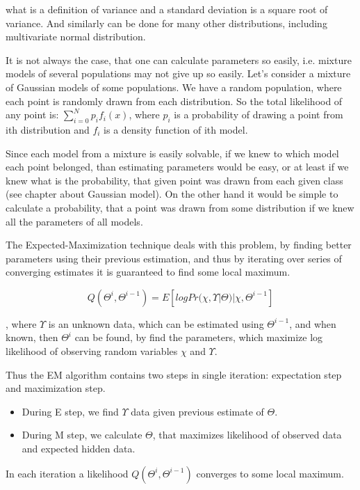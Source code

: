 \documentclass[12pt,a4paper,english]{article}
\begin{document}
what is a definition of variance and a standard deviation is a square root of variance. \newline
And similarly can be done for many other distributions, including multivariate normal distribution. \newline

\newpage

It is not always the case, that one can calculate parameters so easily, i.e. mixture models of several populations may not give up so easily.
Let's consider a mixture of Gaussian models of some populations. We have a random population, where each point is randomly drawn from each distribution. 
So the total likelihood of any point is: $\sum_{i=0}^N p_i f_i(x)$, where $p_i$ is a probability of drawing a point from ith distribution and $f_i$ is a density function of ith model. \newline

Since each model from a mixture is easily solvable, if we knew to which model each point belonged, than estimating parameters would be easy,
or at least if we knew what is the probability, that given point was drawn from each given class (see chapter about Gaussian model). \newline
On the other hand it would be simple to calculate a probability, that a point was drawn from some distribution if we knew all the parameters of all models. \newline


The Expected-Maximization technique deals with this problem, by finding better parameters using their previous estimation, and thus by iterating over series of converging estimates it is guaranteed to find some local maximum. \newline


\begin{equation}
    Q(\Theta^i,\Theta^{ i-1})= E[log Pr(\chi, \Upsilon | \Theta) | \chi, \Theta^{i-1}]
\end{equation}

 , where $\Upsilon$ is an unknown data, which can be estimated using $\Theta^{i-1}$, and when known, then $\Theta^{i}$ can be found, by find the parameters, which maximize log likelihood of observing random variables $\chi$ and $\Upsilon$. \newline


Thus the EM algorithm contains two steps in single iteration: \newline
    expectation step and maximization step. \newline
\begin{itemize}
	\item During E step, we find $\Upsilon$ data given previous estimate of $\Theta$.
	\item During M step, we calculate $\Theta$, that maximizes likelihood of observed data and expected hidden data.
\end{itemize}
In each iteration a likelihood $Q(\Theta^i,\Theta^{ i-1})$ converges to some local maximum. \newline
\end{document}

